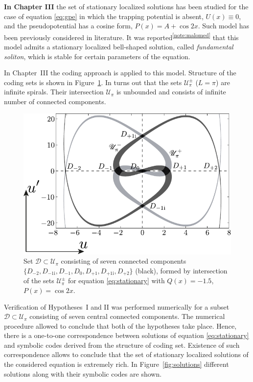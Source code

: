 \documentclass[candidate, href, colorlinks]{disser}
\begin{document}
\textbf{In Chapter III} the set of stationary localized solutions has been studied for the case of equation \eqref{eq:gpe} in which the trapping potential is absent, $U(x) \equiv 0$, and the pseudopotential has a cosine form, $P(x) = A + \cos 2x$.
Such model has been previously considered in literature.
It was reported\textsuperscript{\ref{note:malomed}} that this model admits a stationary localized bell-shaped solution, called {\it fundamental soliton}, which is stable for certain parameters of the equation.

In Chapter~III the coding approach is applied to this model.
Structure of the coding sets is shown in Figure~\ref{fig:island-set}.
In turns out that the sets $\mathscr{U}_{\pi}^{\pm}$ ($L = \pi$) are infinite spirals.
Their intersection $\mathscr{U}_{\pi}$ is unbounded and consists of infinite number of connected components.

\begin{figure}[h]
\centering
	\includegraphics[scale = 1]{../pic/island set to check hypotheses for cosine equation}
	\caption{
		Set $\mathcal{D} \subset \mathscr{U}_{\pi}$ consisting of seven connected components $\{ D_{-2}, D_{-1\mathrm{i}}, D_{-1}, D_0, D_{+1}, D_{+1\mathrm{i}}, D_{+2} \}$ (black), formed by intersection of the sets $\mathscr{U}_{\pi}^{\pm}$ for equation \eqref{eq:stationary} with $Q(x) = -1.5$, $P(x) = \cos 2x$.
	}
\label{fig:island-set}
\end{figure}

Verification of Hypotheses~I and II was performed numerically for a subset $\mathcal{D} \subset \mathscr{U}_{\pi}$ consisting of seven central connected components.
The numerical procedure allowed to conclude that both of the hypotheses take place.
Hence, there is a one-to-one correspondence between solutions of equation \eqref{eq:stationary} and symbolic codes derived from the structure of coding set.
Existence of such correspondence allows to conclude that the set of stationary localized solutions of the considered equation is extremely rich.
In Figure~\ref{fig:solutions} different solutions along with their symbolic codes are shown.
\end{document}
